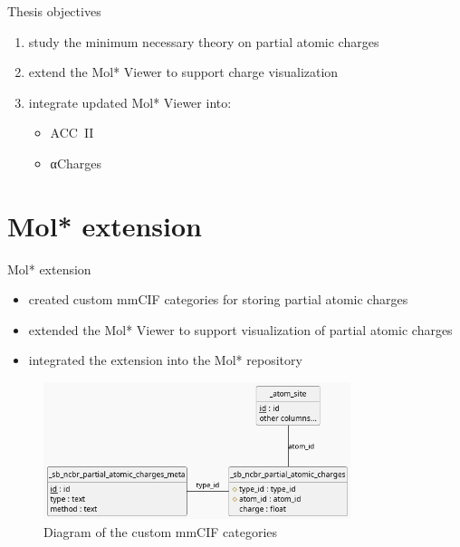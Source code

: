 \documentclass[
]{beamer}
\begin{document}
\begin{frame}{Thesis objectives}
  \begin{enumerate}
    \item study the minimum necessary theory on partial atomic charges
    \item extend the Mol* Viewer to support charge visualization
    \item integrate updated Mol* Viewer into:
    \begin{itemize}
      \item ACC~II
      \item αCharges
    \end{itemize}
  \end{enumerate}
\end{frame}

\section{Mol* extension}

\begin{frame}{Mol* extension}
  \begin{itemize}
    \item created custom mmCIF categories for storing partial atomic charges
    \item extended the Mol* Viewer to support visualization of partial atomic charges
    \item integrated the extension into the Mol* repository
  \end{itemize}
\end{frame}

\begin{frame}{}
  \begin{figure}
    \includegraphics[width=0.8\textwidth,keepaspectratio]{images/mmcif_erd.png}
    \caption{Diagram of the custom mmCIF categories}
  \end{figure}
\end{frame}
\end{document}
